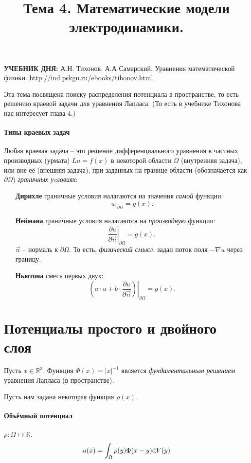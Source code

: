 \documentclass[12pt]{report}
\title{Тема 4. Математические модели электродинамики.}
\begin{document}
	\maketitle

\begin{tcolorbox}
	\textbf{УЧЕБНИК ДНЯ:}
	А.Н. Тихонов, А.А Самарский. Уравнения математической физики.
	\url{http://ind.pskgu.ru/ebooks/tihonov.html}
\end{tcolorbox}

Эта тема посвящена поиску распределения потенциала в пространстве, то есть решению краевой задачи для уравнения Лапласа. (То есть в учебнике Тихонова нас интересует глава 4.)

\paragraph{Типы краевых задач}
Любая краевая задача -- это решение дифференциального уравнения в частных производных (урмата) $Lu = f(x)$ в некоторой области $\Omega$ (внутренняя задача), или вне её (внешняя задача), при заданных на границе области (обозначается как $\partial\Omega$) \emph{граничных уcловиях}:
\begin{enumerate}[(1)]
	\item[\textbf{Дирихле}] граничные условия налагаются на значения \emph{самой} функции: 
	\[
		u\vert_{\partial\Omega}=g(x).
	\]
	\item[\textbf{Неймана}] граничные условия налагаются на \emph{производную} функции: 
	\[
		\left.\frac{\partial u}{\partial\vec n}\right\vert_{\partial\Omega} = g(x),
	\]
	$\vec n$ -- нормаль к $\partial\Omega$. То есть, \emph{физический смысл}: задан поток поля $-\nabla u$ через границу.
	\item[\textbf{Ньютона}] смесь первых двух: 
	\[
		\left.\left(a\cdot u + b\cdot \frac{\partial u}{\partial\vec n}\right)\right\vert_{\partial\Omega} = g(x).
	\]
\end{enumerate}

\section{Потенциалы простого и двойного слоя}
Пусть $x\in\mathbb{R}^3$.
Функция $\Phi(x) = |x|^{-1}$ является \emph{фундаментальным решением} уравнения Лапласа (в пространстве).~\cite[стр.~282]{Tikhonov}

Пусть нам задана некоторая функция $\rho(x)$.
\paragraph{Объёмный потенциал}
$\rho: \Omega \mapsto \mathbb{R}$.
\begin{equation}
	u(x) = \int_\Omega \rho(y)\Phi(x-y)\mathrm d V(y)
\end{equation}
\end{document}
